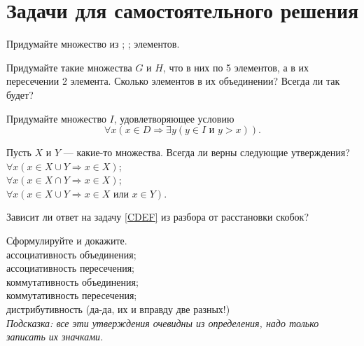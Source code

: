 \documentclass[a4paper,12pt]{article}
\begin{document}
    \section{Задачи для самостоятельного решения}
    
    \problem Придумайте множество из ; ;  элементов.
    
    \problem Придумайте такие множества $G$ и $H$, что в них по 5 элементов, а в их пересечении 2 элемента. Сколько элементов в их объединении? Всегда ли так будет?
    
     Придумайте множество $I$, удовлетворяющее условию
    \begin{equation*}
        \forall x (x \in D \Rightarrow \exists y (y \in I \text{ и } y > x)).
    \end{equation*}
    
    \problem Пусть $X$ и $Y$ --- какие-то множества. Всегда ли верны следующие утверждения? \\
    \sub $\forall x (x \in X \cup Y \Rightarrow x \in X)$; \\
    \sub $\forall x (x \in X \cap Y \Rightarrow x \in X)$; \\
    \sub $\forall x (x \in X \cup Y \Rightarrow x \in X \text{ или } x \in Y)$.
    
    \problem Зависит ли ответ на задачу \ref{CDEF} из разбора от расстановки скобок?
    
    \problem Сформулируйте и докажите. \\
    \sub ассоциативность объединения; \\
    \sub ассоциативность пересечения; \\
    \sub коммутативность объединения; \\
    \sub коммутативность пересечения; \\
     дистрибутивность (да-да, их и вправду две разных!) \\
    \textit{Подсказка: все эти утверждения очевидны из определения, надо только записать их значками.}
\end{document}
